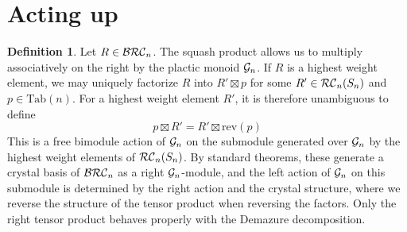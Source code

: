 \documentclass{amsart}
\newtheorem{lemma}{Lemma}[subsection]
\theoremstyle{definition}
\newtheorem{definition}[lemma]{Definition}
\theoremstyle{remark}
\numberwithin{equation}{subsection}
\newcommand{\dsch}{\ensuremath{\Xi}}
\newcommand{\dcoma}{\mathcal{D}}
\begin{document}




\section{Acting up}

\begin{definition}
  Let $R\in \mathcal{BRC}_n$. The squash product allows us to multiply associatively on the right by the plactic monoid $\mathcal{G}_n$. If $R$ is a highest weight element, we may uniquely factorize $R$ into $R'\boxtimes p$ for some $R'\in \mathcal{RC}_n(S_n)$ and $p\in \mathrm{Tab}(n)$. For a highest weight element $R'$, it is therefore unambiguous to define
  $$p\boxtimes R' = R'\boxtimes \mathrm{rev}(p)$$
  This is a free bimodule action of $\mathcal{G}_n$ on the submodule generated over $\mathcal{G}_n$ by the highest weight elements of $\mathcal{RC}_n(S_n)$. By standard theorems, these generate a crystal basis of $\mathcal{BRC}_n$ as a right $\mathcal{G}_n$-module, and the left action of $\mathcal{G}_n$ on this submodule is determined by the right action and the crystal structure, where we reverse the structure of the tensor product when reversing the factors. Only the right tensor product behaves properly with the Demazure decomposition.
\end{definition}
\end{document}
